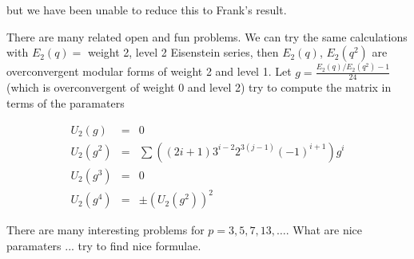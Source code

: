 \documentclass[12pt]{article}
\begin{document}
\noindent but we have been unable to reduce this to Frank's result.

\medskip

There are many related open and fun problems.  We can try the same
calculations with $E_{2}(q) =$ weight 2, level 2 Eisenstein series, then
$E_{2}(q)$, $E_{2}(q^{2})$ are overconvergent modular forms of weight 2 and
level 1.  Let $\displaystyle g = \frac{E_{2}(q)/E_{2}(q^{2}) - 1}{24}$
(which is overconvergent of weight 0 and level 2) try to compute the matrix
in terms of the paramaters

\begin{eqnarray*}
U_{2}(g)     & = & 0 \\
U_{2}(g^{2}) & = & \sum \left( (2i + 1)3^{i -2}2^{3(j-1)}(-1)^{i+1}\right)
g^{i} \\
U_{2}(g^{3}) & = & 0 \\
U_{2}(g^{4}) & = & \pm \left( U_{2}(g^{2}) \right)^{2}
\end{eqnarray*}

There are many interesting problems for $p =3,5,7,13, \ldots$.  What are
nice paramaters ... try to find nice formulae.




 
\end{document}
